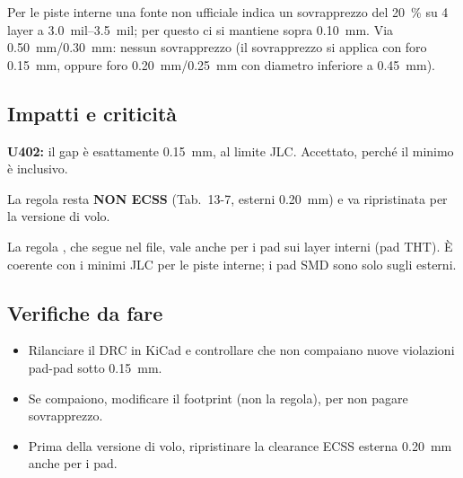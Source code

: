 Per le piste interne una fonte non ufficiale indica un sovrapprezzo del \SI{20}{\percent} su 4 layer a \SIrange{3,0}{3,5}{mil}; per questo ci si mantiene sopra \SI{0,10}{mm}. Via \SI{0,50}{mm}/\SI{0,30}{mm}: nessun sovrapprezzo (il sovrapprezzo si applica con foro \SI{0,15}{mm}, oppure foro \SI{0,20}{mm}/\SI{0,25}{mm} con diametro inferiore a \SI{0,45}{mm}).

\subsection{Impatti e criticità}
\begin{critbox}
\textbf{U402:} il gap è esattamente \SI{0,15}{mm}, al limite JLC. Accettato, perché il minimo è inclusivo.
\end{critbox}
\begin{notebox}
La regola resta \textbf{NON ECSS} (Tab.\ 13-7, esterni \SI{0,20}{mm}) e va ripristinata per la versione di volo.

La regola , che segue nel file, vale anche per i pad sui layer interni (pad THT). È coerente con i minimi JLC per le piste interne; i pad SMD sono solo sugli esterni.
\end{notebox}

\subsection{Verifiche da fare}
\begin{itemize}
\item Rilanciare il DRC in KiCad e controllare che non compaiano nuove violazioni pad-pad sotto \SI{0,15}{mm}.
\item Se compaiono, modificare il footprint (non la regola), per non pagare sovrapprezzo.
\item Prima della versione di volo, ripristinare la clearance ECSS esterna \SI{0,20}{mm} anche per i pad.
\end{itemize}
